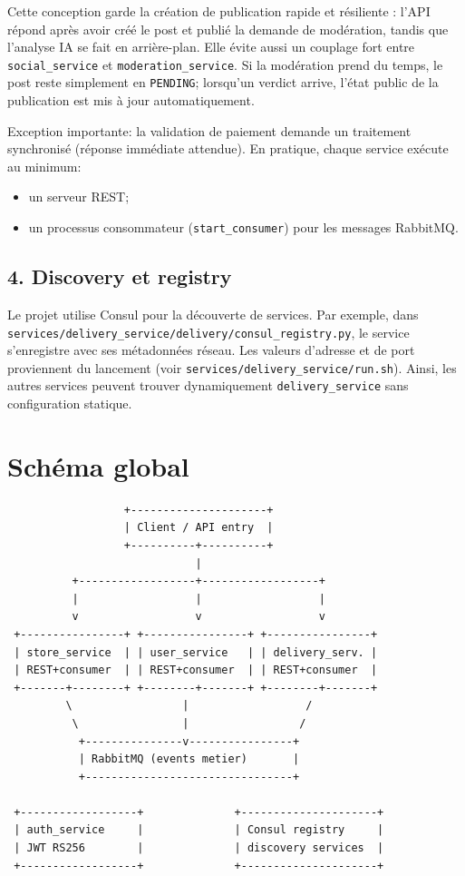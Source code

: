 \documentclass[11pt,a4paper]{article}
\begin{document}
Cette conception garde la création de publication rapide et résiliente : l'API répond après avoir créé le post et publié la demande de modération, tandis que l'analyse IA se fait en arrière-plan. Elle évite aussi un couplage fort entre \texttt{social\_service} et \texttt{moderation\_service}. Si la modération prend du temps, le post reste simplement en \texttt{PENDING}; lorsqu'un verdict arrive, l'état public de la publication est mis à jour automatiquement.

Exception importante: la validation de paiement demande un traitement synchronis\'e (r\'eponse imm\'ediate attendue).
En pratique, chaque service ex\'ecute au minimum:
\begin{itemize}
  \item un serveur REST;
  \item un processus consommateur (\texttt{start\_consumer}) pour les messages RabbitMQ.
\end{itemize}

\subsection{4. Discovery et registry}
Le projet utilise Consul pour la d\'ecouverte de services.
Par exemple, dans \texttt{services/delivery\_service/delivery/consul\_registry.py}, le service s'enregistre avec ses m\'etadonn\'ees r\'eseau.
Les valeurs d'adresse et de port proviennent du lancement (voir \texttt{services/delivery\_service/run.sh}).
Ainsi, les autres services peuvent trouver dynamiquement \texttt{delivery\_service} sans configuration statique.

\section{Sch\'ema global}
\begin{verbatim}
                  +---------------------+
                  | Client / API entry  |
                  +----------+----------+
                             |
          +------------------+------------------+
          |                  |                  |
          v                  v                  v
 +----------------+ +----------------+ +----------------+
 | store_service  | | user_service   | | delivery_serv. |
 | REST+consumer  | | REST+consumer  | | REST+consumer  |
 +-------+--------+ +--------+-------+ +--------+-------+
         \                 |                  /
          \                |                 /
           +---------------v----------------+
           | RabbitMQ (events metier)       |
           +--------------------------------+

 +------------------+              +---------------------+
 | auth_service     |              | Consul registry     |
 | JWT RS256        |              | discovery services  |
 +------------------+              +---------------------+
\end{verbatim}
\end{document}
